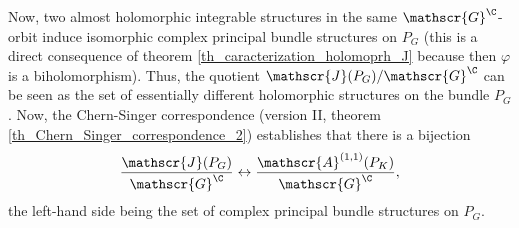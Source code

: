 Now, two almost holomorphic integrable structures in the same \(\mathscr{G}^\C\)-orbit induce isomorphic complex principal bundle structures on \(P_G\) (this is a direct consequence of theorem \ref{th_caracterization_holomoprh_J} because then \(\varphi\) is a biholomorphism). Thus, the quotient \(\mathscr{J}(P_G)/\mathscr{G}^\C\) can be seen as the set of essentially different holomorphic structures on the bundle \(P_G\). Now, the Chern-Singer correspondence (version II, theorem \ref{th_Chern_Singer_correspondence_2}) establishes that there is a bijection
\begin{equation} \label{CS_corresp_quot}
\frac{\mathscr{J}(P_G)}{\mathscr{G}^\C} \leftrightarrow \frac{\mathscr{A}^{(1,1)}(P_K)}{\mathscr{G}^\C},
\end{equation}
the left-hand side being the set of complex principal bundle structures on \(P_G\).
